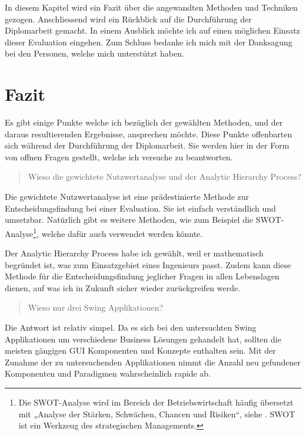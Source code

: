 In diesem Kapitel wird ein Fazit über die angewandten Methoden und Techniken
gezogen. Anschliessend wird ein Rückblick auf die Durchführung der Diplomarbeit
gemacht. In einem Ausblick möchte ich auf einen möglichen Einsatz dieser
Evaluation eingehen. Zum Schluss bedanke ich mich mit der Danksagung bei den
Personen, welche mich unterstützt haben.

\section{Fazit}

Es gibt einige Punkte welche ich bezüglich der gewählten Methoden, und der
daraus resultierenden Ergebnisse, ansprechen möchte. Diese Punkte
offenbarten sich während der Durchführung der Diplomarbeit. Sie werden hier
in der Form von offnen Fragen gestellt, welche ich versuche zu beantworten.
\newline

\begin{quote}\begin{itshape}Wieso die gewichtete Nutzwertanalyse und der
Analytic Hierarchy Process?\end{itshape}\end{quote}

Die gewichtete Nutzwertanalyse ist eine prädestinierte Methode zur
Entscheidungsfindung bei einer Evaluation. Sie ist einfach verständlich und
umsetzbar. Natürlich gibt es weitere Methoden, wie zum Beispiel die
SWOT-Analyse\footnote{Die SWOT-Analyse wird im Bereich der Betriebswirtschaft
häufig übersetzt mit „Analyse der Stärken, Schwächen, Chancen und
Risiken“, siehe \cite{SWOT}. SWOT ist ein Werkzeug des strategischen
Managements.}, welche dafür auch verwendet werden könnte.

Der Analytic Hierarchy Process habe ich gewählt, weil er mathematisch begründet
ist, was zum Einsatzgebiet eines Ingenieurs passt. Zudem kann diese Methode für
die Entscheidungsfindung jeglicher Fragen in allen Lebenslagen dienen, auf
was ich in Zukunft sicher wieder zurückgreifen werde.

\clearpage

\begin{quote}\begin{itshape}Wieso nur drei Swing
Applikationen?\end{itshape}\end{quote}

Die Antwort ist relativ simpel. Da es sich bei den untersuchten Swing
Applikationen um verschiedene Business Lösungen gehandelt hat, sollten die
meisten gängigen GUI Komponenten und Konzepte enthalten sein. Mit der Zunahme
der zu untersuchenden Applikationen nimmt die Anzahl neu gefundener Komponenten
und Paradigmen wahrscheinlich rapide ab.
\newline

